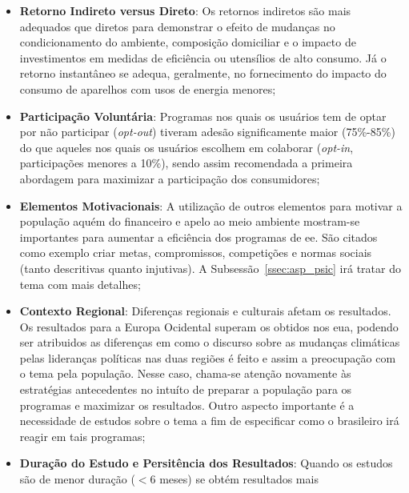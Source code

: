 \begin{itemize}
\item \textbf{Retorno Indireto versus Direto}: 
Os retornos indiretos são mais adequados que diretos 
para demonstrar o efeito de mudanças no condicionamento do ambiente, 
composição domiciliar e o impacto de investimentos 
em medidas de eficiência ou utensílios de alto consumo. Já o retorno instantâneo 
se adequa, geralmente, no fornecimento do impacto do consumo de aparelhos com 
usos de energia menores;
\item \textbf{Participação Voluntária}: Programas nos quais os usuários tem de
optar por não participar (\emph{opt-out}) tiveram adesão significamente 
maior (75\%-85\%) do que aqueles nos quais os usuários escolhem em colaborar
(\emph{opt-in}, participações menores a 10\%), sendo assim recomendada
a primeira abordagem para maximizar a participação dos consumidores;
\item \textbf{Elementos Motivacionais}: A utilização de outros elementos para
motivar a população aquém do financeiro e apelo ao meio ambiente mostram-se 
importantes para aumentar a eficiência dos programas de \gls{ee}. São citados
como exemplo criar metas, compromissos, competições e normas sociais 
(tanto descritivas quanto injutivas). A Subsessão~\ref{ssec:asp_psic} 
irá tratar do tema com mais detalhes;
\item \textbf{Contexto Regional}: Diferenças regionais e culturais afetam os 
resultados. Os resultados para a Europa Ocidental superam os obtidos nos
\gls{eua}, podendo ser atribuidos as diferenças em como o 
discurso sobre as mudanças climáticas pelas lideranças políticas nas duas regiões 
é feito e assim a preocupação com o tema pela população. Nesse caso, chama-se atenção
novamente às estratégias antecedentes no intuíto de preparar a população para os programas e
maximizar os resultados. Outro aspecto importante é a necessidade de estudos
sobre o tema a fim de especificar como o brasileiro irá reagir em tais programas;
\item \textbf{Duração do Estudo e Persitência dos Resultados}: Quando os 
estudos são de menor duração ($< 6$ meses) se obtém resultados mais 

\end{itemize}
